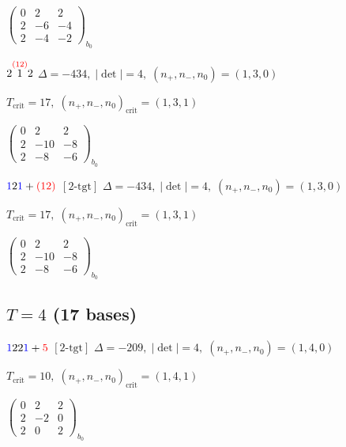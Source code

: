 \documentclass[10pt]{article}
\begin{document}
\hspace{2em}$\left(\begin{smallmatrix}0 & 2 & 2 \\ 2 & -6 & -4 \\ 2 & -4 & -2\end{smallmatrix}\right)_{\!b_0}$

\smallskip

$2\overset{\textcolor{red}{(12)}}{1}2$ \quad $\Delta=-434,\; |\det|=4,\; (n_+,n_-,n_0)=(1,3,0)$

\hspace{1em}$T_{\text{crit}}=17,\; (n_+,n_-,n_0)_{\text{crit}}=(1,3,1)$

\hspace{2em}$\left(\begin{smallmatrix}0 & 2 & 2 \\ 2 & -10 & -8 \\ 2 & -8 & -6\end{smallmatrix}\right)_{\!b_0}$

\smallskip

$\textcolor{blue}{1}2\textcolor{blue}{1}+\textcolor{red}{(12)}$ $\scriptstyle [2\text{-tgt}]$ \quad $\Delta=-434,\; |\det|=4,\; (n_+,n_-,n_0)=(1,3,0)$

\hspace{1em}$T_{\text{crit}}=17,\; (n_+,n_-,n_0)_{\text{crit}}=(1,3,1)$

\hspace{2em}$\left(\begin{smallmatrix}0 & 2 & 2 \\ 2 & -10 & -8 \\ 2 & -8 & -6\end{smallmatrix}\right)_{\!b_0}$


\subsection*{$T = 4$ \quad (17 bases)}
\smallskip

$\textcolor{blue}{1}22\textcolor{blue}{1}+\textcolor{red}{5}$ $\scriptstyle [2\text{-tgt}]$ \quad $\Delta=-209,\; |\det|=4,\; (n_+,n_-,n_0)=(1,4,0)$

\hspace{1em}$T_{\text{crit}}=10,\; (n_+,n_-,n_0)_{\text{crit}}=(1,4,1)$

\hspace{2em}$\left(\begin{smallmatrix}0 & 2 & 2 \\ 2 & -2 & 0 \\ 2 & 0 & 2\end{smallmatrix}\right)_{\!b_0}$
\end{document}
